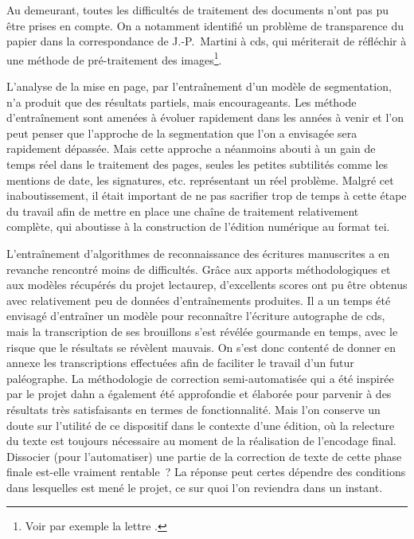 \documentclass[a4paper,12pt,twoside]{book}
\begin{document}
		Au demeurant, toutes les difficultés de traitement des documents n'ont pas pu être prises en compte. On a notamment identifié un problème de transparence du papier dans la correspondance de J.-P.~Martini à \gls{cds}, qui mériterait de réfléchir à une méthode de pré-traitement des images\footnote{Voir par exemple la lettre \cite{CdS19054056}.}.
		
		L'analyse de la mise en page, par l'entraînement d'un modèle de \gls{segmentation}, n'a produit que des résultats partiels, mais encourageants. Les méthode d'entraînement sont amenées à évoluer rapidement dans les années à venir et l'on peut penser que l'approche de la \gls{segmentation} que l'on a envisagée sera rapidement dépassée. Mais cette approche a néanmoins abouti à un gain de temps réel dans le traitement des pages, seules les petites subtilités comme les mentions de date, les signatures, etc. représentant un réel problème. Malgré cet inaboutissement, il était important de ne pas sacrifier trop de temps à cette étape du travail afin de mettre en place une chaîne de traitement relativement complète, qui aboutisse à la construction de l'édition numérique au format \gls{tei}.
		
		L'entraînement d'algorithmes de reconnaissance des écritures manuscrites a en revanche rencontré moins de difficultés. Grâce aux apports méthodologiques et aux modèles récupérés du projet \gls{lectaurep}, d'excellents scores ont pu être obtenus avec relativement peu de données d'entraînements produites.
		Il a un temps été envisagé d'entraîner un modèle pour reconnaître l'écriture autographe de \gls{cds}, mais la transcription de ses brouillons s'est révélée gourmande en temps, avec le risque que le résultats se révèlent mauvais. On s'est donc contenté de donner en annexe les transcriptions effectuées afin de faciliter le travail d'un futur paléographe.
		La méthodologie de correction semi-automatisée qui a été inspirée par le projet \gls{dahn} a également été approfondie et élaborée pour parvenir à des résultats très satisfaisants en termes de fonctionnalité. Mais l'on conserve un doute sur l'utilité de ce dispositif dans le contexte d'une édition, où la relecture du texte est toujours nécessaire au moment de la réalisation de l'encodage final. Dissocier (pour l'automatiser) une partie de la correction de texte de cette phase finale est-elle vraiment rentable~? La réponse peut certes dépendre des conditions dans lesquelles est mené le projet, ce sur quoi l'on reviendra dans un instant.
		
\end{document}
